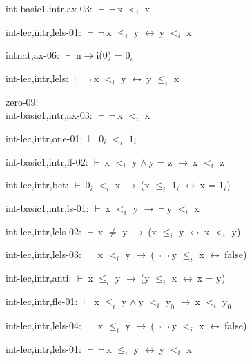 \documentclass[a4paper]{article}
\newcommand{\Fol}{\mbox{$\vdash\ $}}
\newcommand{\Not}{\mbox{$\neg\ $}}
\newcommand{\And}{\mbox{$\wedge\ $}}
\newcommand{\Imp}{\mbox{$\rightarrow\ $}}
\newcommand{\Equiv}{\mbox{$\leftrightarrow\ $}}
\begin{document}
int-basic1,intr,ax-03: 
 \Fol \Not x $\mbox{$<$}_{i}$ x



int-lec,intr,lels-01: 
 \Fol \Not x $\mbox{$\le$}_{i}$ y \Equiv y $\mbox{$<$}_{i}$ x



intnat,ax-06: 
 \Fol n$\to$i(0) = $\mbox{0}_{i}$



int-lec,intr,lels: 
 \Fol \Not x $\mbox{$<$}_{i}$ y \Equiv y $\mbox{$\le$}_{i}$ x



\bigskip

zero-09:\\ int-basic1,intr,ax-03: 
 \Fol \Not x $\mbox{$<$}_{i}$ x



int-lec,intr,one-01: 
 \Fol $\mbox{0}_{i}$ $\mbox{$<$}_{i}$ $\mbox{1}_{i}$



int-basic1,intr,lf-02: 
 \Fol x $\mbox{$<$}_{i}$ y \And y = z \Imp x $\mbox{$<$}_{i}$ z



int-lec,intr,bet: 
 \Fol $\mbox{0}_{i}$ $\mbox{$<$}_{i}$ x \Imp (x $\mbox{$\le$}_{i}$ $\mbox{1}_{i}$ \Equiv x = $\mbox{1}_{i}$)



int-basic1,intr,ls-01: 
 \Fol x $\mbox{$<$}_{i}$ y \Imp \Not y $\mbox{$<$}_{i}$ x



int-lec,intr,lels-02: 
 \Fol x $\neq$ y \Imp (x $\mbox{$\le$}_{i}$ y \Equiv x $\mbox{$<$}_{i}$ y)



int-lec,intr,lels-03: 
 \Fol x $\mbox{$<$}_{i}$ y \Imp (\Not \Not y $\mbox{$\le$}_{i}$ x \Equiv false)



int-lec,intr,anti: 
 \Fol x $\mbox{$\le$}_{i}$ y \Imp (y $\mbox{$\le$}_{i}$ x \Equiv x = y)



int-lec,intr,fle-01: 
 \Fol x $\mbox{$\le$}_{i}$ y \And y $\mbox{$<$}_{i}$ $\mbox{y}_{0}$ \Imp x $\mbox{$<$}_{i}$ $\mbox{y}_{0}$



int-lec,intr,lels-04: 
 \Fol x $\mbox{$\le$}_{i}$ y \Imp (\Not \Not y $\mbox{$<$}_{i}$ x \Equiv false)



int-lec,intr,lels-01: 
 \Fol \Not x $\mbox{$\le$}_{i}$ y \Equiv y $\mbox{$<$}_{i}$ x
\end{document}
